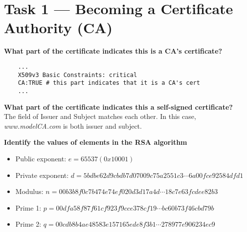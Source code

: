 \section{Task 1 --- Becoming a Certificate Authority (CA)}
%

\textbf{What part of the certificate indicates this is a CA's certificate?}\\
%
\begin{verbatim}
    ...
    X509v3 Basic Constraints: critical
    CA:TRUE # this part indicates that it is a CA's cert
    ...
\end{verbatim}

\textbf{What part of the certificate indicates this a self-signed
certificate?}\\
%
The field of {\selectfont Issuer} and {\selectfont
Subject} matches each other. In this case, \emph{www.modelCA.com} is both
issuer and subject.

\textbf{Identify the values of elements in the RSA algorithm}\\
%
\begin{itemize}
    \item Public exponent: \(e = 65537 (0x10001)\)
    \item Private exponent: \(d = 5bdbe62d9cbdb7d07009c75a2551c3 \cdots
    6a00fce92584dfd1\)
    \item Modulus: \(n = 00b3b8f0c7b474e74ef020d3d17a4d \cdots
    18c7e63fcdee82b3\)
    \item Prime 1: \(p = 00dfa58f87f61cf923f9cce378cf19 \cdots
    bc60b73f46cbd79b\)
    \item Prime 2: \(q = 00cdb8b4ae48583e157165ede8f3b1 \cdots
    278977e906234ec9\)
\end{itemize}